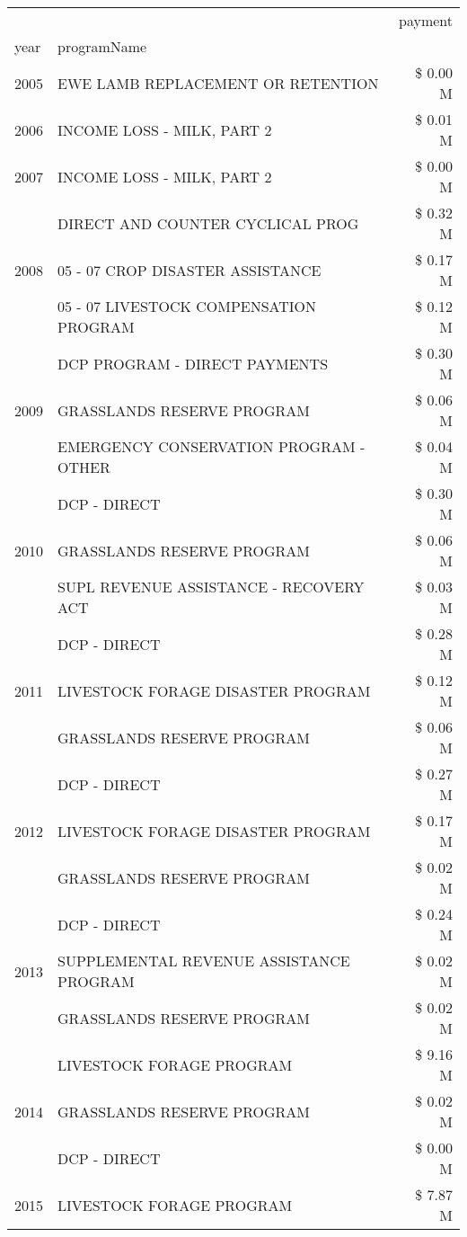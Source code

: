\begin{tabular}{llr}
\toprule
 &  & payment \\
year & programName &  \\
\midrule
2005 & EWE LAMB REPLACEMENT OR RETENTION & \$ 0.00 M \\
\cline{1-3}
2006 & INCOME LOSS - MILK, PART 2 & \$ 0.01 M \\
\cline{1-3}
2007 & INCOME LOSS - MILK, PART 2 & \$ 0.00 M \\
\cline{1-3}
\multirow[t]{3}{*}{2008} & DIRECT AND COUNTER CYCLICAL PROG & \$ 0.32 M \\
 & 05 - 07 CROP DISASTER ASSISTANCE & \$ 0.17 M \\
 & 05 - 07 LIVESTOCK COMPENSATION PROGRAM & \$ 0.12 M \\
\cline{1-3}
\multirow[t]{3}{*}{2009} & DCP PROGRAM - DIRECT PAYMENTS & \$ 0.30 M \\
 & GRASSLANDS RESERVE PROGRAM & \$ 0.06 M \\
 & EMERGENCY CONSERVATION PROGRAM - OTHER & \$ 0.04 M \\
\cline{1-3}
\multirow[t]{3}{*}{2010} & DCP - DIRECT & \$ 0.30 M \\
 & GRASSLANDS RESERVE PROGRAM & \$ 0.06 M \\
 & SUPL REVENUE ASSISTANCE - RECOVERY ACT & \$ 0.03 M \\
\cline{1-3}
\multirow[t]{3}{*}{2011} & DCP - DIRECT & \$ 0.28 M \\
 & LIVESTOCK FORAGE DISASTER PROGRAM & \$ 0.12 M \\
 & GRASSLANDS RESERVE PROGRAM & \$ 0.06 M \\
\cline{1-3}
\multirow[t]{3}{*}{2012} & DCP - DIRECT & \$ 0.27 M \\
 & LIVESTOCK FORAGE DISASTER PROGRAM & \$ 0.17 M \\
 & GRASSLANDS RESERVE PROGRAM & \$ 0.02 M \\
\cline{1-3}
\multirow[t]{3}{*}{2013} & DCP - DIRECT & \$ 0.24 M \\
 & SUPPLEMENTAL REVENUE ASSISTANCE PROGRAM & \$ 0.02 M \\
 & GRASSLANDS RESERVE PROGRAM & \$ 0.02 M \\
\cline{1-3}
\multirow[t]{3}{*}{2014} & LIVESTOCK FORAGE PROGRAM & \$ 9.16 M \\
 & GRASSLANDS RESERVE PROGRAM & \$ 0.02 M \\
 & DCP - DIRECT & \$ 0.00 M \\
\cline{1-3}
\multirow[t]{3}{*}{2015} & LIVESTOCK FORAGE PROGRAM & \$ 7.87 M \\

\end{tabular}
